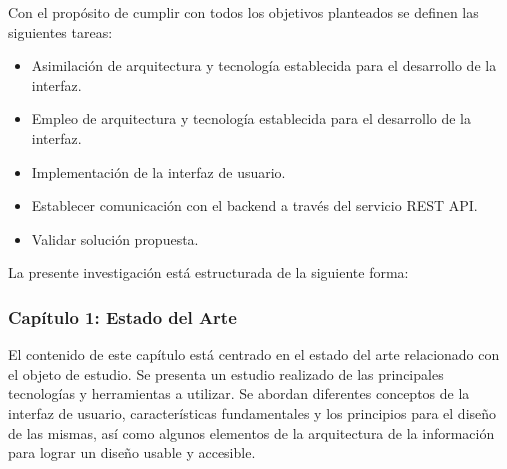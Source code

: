 Con el propósito de cumplir con todos los objetivos planteados se definen las siguientes tareas:

\begin{itemize}
\item Asimilaci\'on de arquitectura y tecnolog\'ia establecida para el desarrollo de la interfaz.
\item Empleo de arquitectura y tecnolog\'ia establecida para el desarrollo de la interfaz.
\item Implementaci\'on de la interfaz de usuario.
\item Establecer comunicaci\'on con el backend  a trav\'es del servicio REST API. %
\item Validar soluci\'on propuesta.
\end{itemize}

La presente investigación está estructurada de la siguiente forma:

\subsubsection*{Capítulo 1: Estado del Arte}

El contenido de este capítulo está centrado en el estado del arte relacionado con el objeto de estudio. Se presenta un estudio realizado de las principales tecnologías y herramientas a utilizar. Se abordan diferentes conceptos de la interfaz de usuario, características fundamentales y los principios para el diseño de las mismas, así como algunos elementos de la arquitectura de la información para lograr un diseño usable y accesible.

%
%
%

